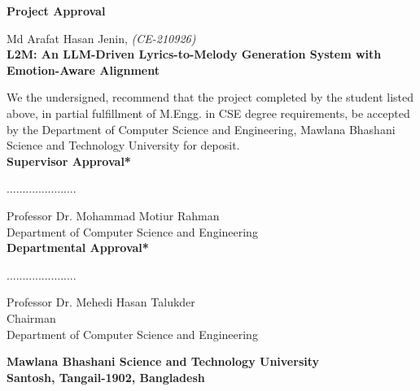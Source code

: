 \begin{titlepage}
\begin{center}


    \LARGE
    \textbf{Project Approval\\}

    \vspace{2cm}

    \large
    \large{Md Arafat Hasan Jenin, \small{\textit{(CE-210926)}}}\\

    \vspace{0.5cm}
    \large
    \textbf{L2M: An LLM-Driven Lyrics-to-Melody Generation System with Emotion-Aware Alignment\\}


    \vspace{1cm}
    \normalsize
     We the undersigned, recommend that the project completed by the student listed above, in partial fulfillment of M.Engg. in CSE degree requirements, be accepted by the Department of Computer Science and Engineering, Mawlana Bhashani Science and Technology University for deposit.\\



     \vspace{1cm}
     \normalsize
     \textbf{Supervisor Approval*}

      \vspace{1cm}
      \normalsize
      ......................

      \vspace{0.2cm}
      \normalsize
      Professor Dr. Mohammad Motiur Rahman \\
      Department of Computer Science and Engineering\\

    \vspace{0.3cm}
    \normalsize
     \textbf{Departmental Approval*}

      \vspace{1cm}
      \normalsize
      ......................

      \vspace{0.2cm}
      \normalsize
      Professor Dr. Mehedi Hasan Talukder \\
      Chairman \\Department of Computer Science and Engineering


      \vspace{1cm}
      \normalsize
      \textbf
      {Mawlana Bhashani Science and Technology University\\
      Santosh, Tangail-1902, Bangladesh}


\end{center}
\end{titlepage}

